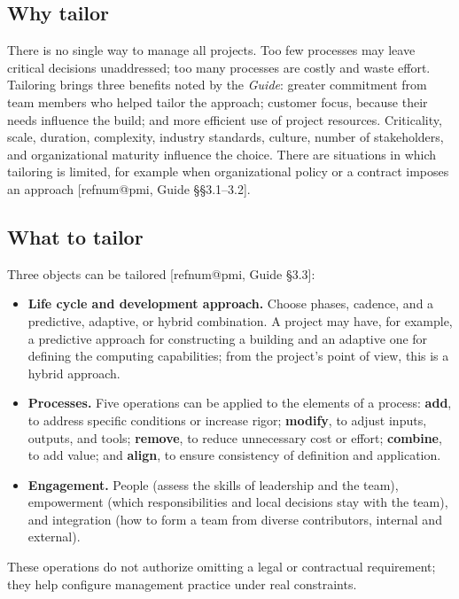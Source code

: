 \documentclass[12pt,a4paper,article,oneside,brazil,english]{abntex2}
\makeatletter
\newcommand{\refnum}[1]{\csname refnum@#1\endcsname}
\makeatother
\begin{document}
\subsection{Why tailor}

There is no single way to manage all projects. Too few processes may leave critical decisions unaddressed; too many processes are costly and waste effort. Tailoring brings three benefits noted by the \textit{Guide}: greater commitment from team members who helped tailor the approach; customer focus, because their needs influence the build; and more efficient use of project resources. Criticality, scale, duration, complexity, industry standards, culture, number of stakeholders, and organizational maturity influence the choice. There are situations in which tailoring is limited, for example when organizational policy or a contract imposes an approach [\refnum{pmi}, Guide §§3.1–3.2].
\subsection{What to tailor}

Three objects can be tailored [\refnum{pmi}, Guide §3.3]:

\begin{itemize}
\item \textbf{Life cycle and development approach.} Choose phases, cadence, and a predictive, adaptive, or hybrid combination. A project may have, for example, a predictive approach for constructing a building and an adaptive one for defining the computing capabilities; from the project's point of view, this is a hybrid approach.
\item \textbf{Processes.} Five operations can be applied to the elements of a process: \textbf{add}, to address specific conditions or increase rigor; \textbf{modify}, to adjust inputs, outputs, and tools; \textbf{remove}, to reduce unnecessary cost or effort; \textbf{combine}, to add value; and \textbf{align}, to ensure consistency of definition and application.
\item \textbf{Engagement.} People (assess the skills of leadership and the team), empowerment (which responsibilities and local decisions stay with the team), and integration (how to form a team from diverse contributors, internal and external).
\end{itemize}

These operations do not authorize omitting a legal or contractual requirement; they help configure management practice under real constraints.
\end{document}
